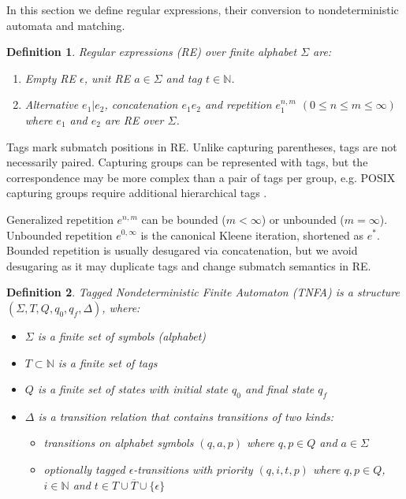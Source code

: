 \documentclass[]{article}
\newtheorem{definition}{Definition}
\newcommand*{\Xbar}[1]{\overline{#1}}
\newcommand{\YN}{\mathbb{N}}
\begin{document}
In this section we define regular expressions, their conversion to nondeterministic automata and matching.

\begin{definition}
Regular expressions (RE) over finite alphabet $\Sigma$ are:
\begin{enumerate}
    \item
      Empty RE $\epsilon$,
      unit RE $a \in \Sigma$
      and tag $t \in \YN$.
    \item Alternative $e_1 | e_2$,
      concatenation $e_1 e_2$ and
      repetition $e_1^{n, m}$ $(0 \!\leq\! n \!\leq\! m \!\leq\! \infty)$
      where $e_1$ and $e_2$ are RE over $\Sigma$.
\end{enumerate}
\end{definition}

Tags mark submatch positions in RE.
Unlike capturing parentheses, tags are not necessarily paired.
Capturing groups can be represented with tags,
but the correspondence may be more complex than a pair of tags per group,
e.g. POSIX capturing groups require additional hierarchical tags \cite{BorTro19}.
\medskip

Generalized repetition $e^{n, m}$ can be bounded ($m < \infty$) or unbounded ($m = \infty$).
Unbounded repetition $e^{0,\infty}$ is the canonical Kleene iteration, shortened as $e^*$.
Bounded repetition is usually desugared via concatenation,
but we avoid desugaring as it may duplicate tags and change submatch semantics in RE.

\begin{definition} \label{def_tnfa}
Tagged Nondeterministic Finite Automaton (TNFA)
is a structure $(\Sigma, T, Q, q_0, q_f, \Delta)$, where:
\begin{itemize}
    \item[] $\Sigma$ is a finite set of symbols (alphabet)
    \item[] $T \subset \YN$ is a finite set of tags
    \item[] $Q$ is a finite set of states with initial state $q_0$ and final state $q_f$
    \item[] $\Delta$ is a transition relation that contains transitions of two kinds:
    \begin{itemize}
        \item[] transitions on alphabet symbols $(q, a, p)$ where $q, p \in Q$ and $a \in \Sigma$
        \item[] optionally tagged $\epsilon$-transitions with priority $(q, i, t, p)$ where $q, p \in Q$, $i \in \YN$ and $t \in T \cup \Xbar{T} \cup \{\epsilon\}$
    \end{itemize}
\end{itemize}
\end{definition}
\end{document}
